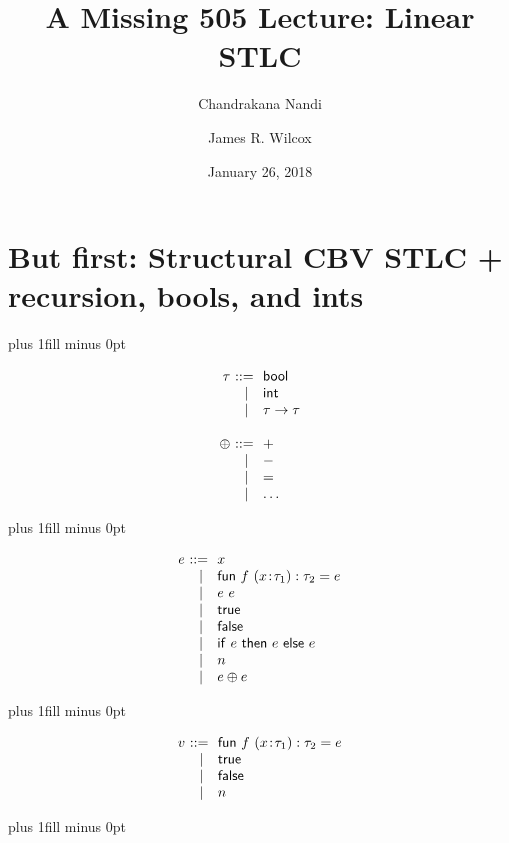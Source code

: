 \documentclass{article}
\title{\vspace{-60pt}A Missing 505 Lecture: Linear STLC}
\author{Chandrakana Nandi\and James R. Wilcox}
\date{January 26, 2018}
\newcommand{\bnfeq}{&::=&}
\newcommand{\bnfalt}{&~\mid&}
\newcommand{\kw}[1]{\ensuremath{\mathsf{#1}}}
\newcommand{\unit}{\ensuremath{\kw{unit}}}
\newcommand{\bool}{\ensuremath{\kw{bool}}}
\newcommand{\tyint}{\ensuremath{\kw{int}}}
\newcommand{\true}{\ensuremath{\kw{true}}}
\newcommand{\false}{\ensuremath{\kw{false}}}
\newcommand{\IF}[3]{\ensuremath{\kw{if}\ #1\ \kw{then}\ #2\ \kw{else}\ #3}}
\newcommand{\Colon}{{\hspace{1pt}:\hspace{1pt}}}
\newcommand{\LAMBDA}[3]{\lambda #1\Colon#2.\; #3}
\newcommand{\fun}{\ensuremath{\kw{fun}}}
\newcommand{\fix}[5]{\fun\ #1\ (#2\Colon#3):#4 = #5}
\begin{document}
\maketitle

\section*{But first: Structural CBV STLC + recursion, bools, and ints}

{
\noindent
\hskip 1cm plus 1fill minus 0pt
\begin{varwidth}[t]{0.5\textwidth}
\[
\begin{array}{r@{~}c@{~~}l}
  \tau \bnfeq
       \bool\\
       \bnfalt \tyint\\
       \bnfalt \tau\to\tau\\\\
  \oplus\bnfeq
       +\\
       \bnfalt -\\
       \bnfalt =\\
       \bnfalt\ldots\\
\end{array}
\]
\end{varwidth}
\hskip 0pt plus 1fill minus 0pt
\begin{varwidth}[t]{0.5\textwidth}
\[
\begin{array}{r@{~}c@{~~}l}
  e \bnfeq     x \\
    \bnfalt    \fix{f}{x}{\tau_1}{\tau_2}{e}\\
    \bnfalt    e\ e \\
    \bnfalt    \true \\
    \bnfalt    \false \\
    \bnfalt    \IF{e}{e}{e}\\
    \bnfalt    n \\
    \bnfalt    e \oplus e \\

\end{array}
\]
\end{varwidth}
\hskip -1cm plus 1fill minus 0pt
\begin{varwidth}[t]{0.5\textwidth}
\[
\begin{array}{r@{~}c@{~~}l}
  v \bnfeq     \fix{f}{x}{\tau_1}{\tau_2}{e}\\
    \bnfalt    \true \\
    \bnfalt    \false\\
    \bnfalt    n\\
\end{array}
\]
\end{varwidth}
\hskip 0pt plus 1fill minus 0pt
}
\end{document}
